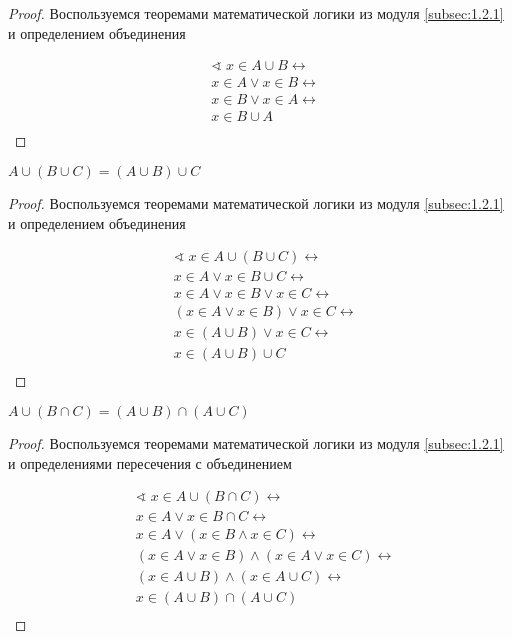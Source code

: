 \begin{proof}
    Воспользуемся теоремами математической логики из модуля \ref{subsec:1.2.1} и определением объединения

    \begin{align*}
        & \sphericalangle \; x \in A \cup B \leftrightarrow \\
        & x \in A \lor x \in B \leftrightarrow \\
        & x \in B \lor x \in A \leftrightarrow \\
        & x \in B \cup A \\
    \end{align*}
\end{proof}

\begin{theorem}
    $A \cup (B \cup C) = (A \cup B) \cup C$
\end{theorem}

\begin{proof}
    Воспользуемся теоремами математической логики из модуля \ref{subsec:1.2.1} и определением объединения

    \begin{align*}
        & \sphericalangle \; x \in A \cup (B \cup C) \leftrightarrow \\
        & x \in A \lor x \in B \cup C \leftrightarrow \\
        & x \in A \lor x \in B \lor x \in C \leftrightarrow \\
        & (x \in A \lor x \in B) \lor x \in C \leftrightarrow \\
        & x \in (A \cup B) \lor x \in C \leftrightarrow \\
        & x \in (A \cup B) \cup C \\
    \end{align*}
\end{proof}

\newpage

\begin{theorem}
    \hfill \break \break
    $A \cup (B \cap C) = (A \cup B) \cap (A \cup C)$
\end{theorem}

\begin{proof}
    Воспользуемся теоремами математической логики из модуля \ref{subsec:1.2.1} и определениями пересечения с объединением

    \begin{align*}
        & \sphericalangle \; x \in A \cup (B \cap C) \leftrightarrow \\
        & x \in A \lor x \in B \cap C \leftrightarrow \\
        & x \in A \lor (x \in B \land x \in C) \leftrightarrow \\
        & (x \in A \lor x \in B) \land (x \in A \lor x \in C) \leftrightarrow \\
        & (x \in A \cup B) \land (x \in A \cup C) \leftrightarrow \\
        & x \in (A \cup B) \cap  (A \cup C) \\
    \end{align*}
\end{proof}

